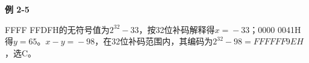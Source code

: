 {\color{ink}\bfseries 例 2-5}\par\vspace{1bp}FFFF FFDFH的无符号值为\(2^{32}-33\)，按32位补码解释得\(x=\allowbreak{}-33\)；0000 0041H得\(y=\allowbreak{}65\)。\(x-y=\allowbreak{}-98\)，在32位补码范围内，其编码为\(2^{32}-98=\allowbreak{}FFFF FF9EH\)，选C。

